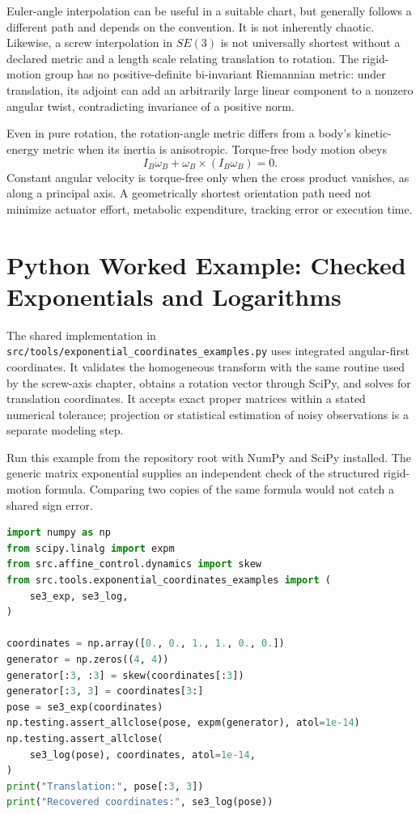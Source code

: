 Euler-angle interpolation can be useful in a suitable chart, but generally follows a different path and depends on the convention. It is not inherently chaotic. Likewise, a screw interpolation in $SE(3)$ is not universally shortest without a declared metric and a length scale relating translation to rotation. The rigid-motion group has no positive-definite bi-invariant Riemannian metric: under translation, its adjoint can add an arbitrarily large linear component to a nonzero angular twist, contradicting invariance of a positive norm.

Even in pure rotation, the rotation-angle metric differs from a body's kinetic-energy metric when its inertia is anisotropic. Torque-free body motion obeys
\begin{equation}
 I_B\dot\omega_B+\omega_B\times(I_B\omega_B)=0.
 \label{eq:exponential_free_rotation}
\end{equation}
Constant angular velocity is torque-free only when the cross product vanishes, as along a principal axis. A geometrically shortest orientation path need not minimize actuator effort, metabolic expenditure, tracking error or execution time.

\section{Python Worked Example: Checked Exponentials and Logarithms}
\label{sec:python_exp_log}

The shared implementation in \texttt{src/tools/exponential\_coordinates\_examples.py} uses integrated angular-first coordinates. It validates the homogeneous transform with the same routine used by the screw-axis chapter, obtains a rotation vector through SciPy, and solves for translation coordinates. It accepts exact proper matrices within a stated numerical tolerance; projection or statistical estimation of noisy observations is a separate modeling step.

Run this example from the repository root with NumPy and SciPy installed. The generic matrix exponential supplies an independent check of the structured rigid-motion formula. Comparing two copies of the same formula would not catch a shared sign error.

\begin{lstlisting}[language=Python,basicstyle=\ttfamily\small]
import numpy as np
from scipy.linalg import expm
from src.affine_control.dynamics import skew
from src.tools.exponential_coordinates_examples import (
    se3_exp, se3_log,
)

coordinates = np.array([0., 0., 1., 1., 0., 0.])
generator = np.zeros((4, 4))
generator[:3, :3] = skew(coordinates[:3])
generator[:3, 3] = coordinates[3:]
pose = se3_exp(coordinates)
np.testing.assert_allclose(pose, expm(generator), atol=1e-14)
np.testing.assert_allclose(
    se3_log(pose), coordinates, atol=1e-14,
)
print("Translation:", pose[:3, 3])
print("Recovered coordinates:", se3_log(pose))
\end{lstlisting}

